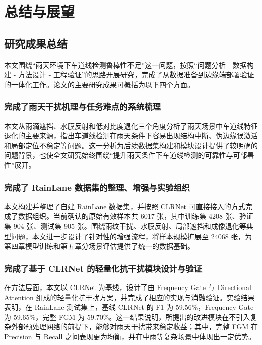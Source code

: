 \chapter{总结与展望}
\label{chap:conclusion}

\section{研究成果总结}
\label{sec:achievement}

本文围绕“雨天环境下车道线检测鲁棒性不足”这一问题，按照“问题分析 - 数据构建 - 方法设计 - 工程验证”的思路开展研究，完成了从数据准备到边缘端部署验证的一体化工作。论文的主要研究成果可概括为以下四个方面。

\subsection{完成了雨天干扰机理与任务难点的系统梳理}

本文从雨滴遮挡、水膜反射和低对比度退化三个角度分析了雨天场景中车道线特征退化的主要来源，指出车道线检测在雨天条件下容易出现结构中断、伪边缘误激活和局部定位不稳定等问题。这一分析为后续数据集构建和模块设计提供了较明确的问题背景，也使全文研究始终围绕“提升雨天条件下车道线检测的可靠性与可部署性”展开。

\subsection{完成了 RainLane 数据集的整理、增强与实验组织}

本文构建并整理了自建 RainLane 数据集，并按照 CLRNet 可直接接入的方式完成了数据组织。当前确认的原始有效样本共 6017 张，其中训练集 4208 张、验证集 904 张、测试集 905 张。围绕雨纹干扰、水膜反射、局部遮挡和成像退化等典型问题，本文进一步设计了针对性的增强流程，将样本规模扩展至 24068 张，为第四章模型训练和第五章分场景评估提供了统一的数据基础。

\subsection{完成了基于 CLRNet 的轻量化抗干扰模块设计与验证}

在方法层面，本文以 CLRNet 为基线，设计了由 Frequency Gate 与 Directional Attention 组成的轻量化抗干扰方案，并完成了相应的实现与消融验证。实验结果表明，在 RainLane 测试集上，基线 CLRNet 的 F1 为 59.56\%，Frequency Gate 为 59.65\%，完整 FGM 为 59.70\%。这一结果说明，所提出的改进模块在不引入复杂外部预处理网络的前提下，能够对雨天干扰带来稳定收益；其中，完整 FGM 在 Precision 与 Recall 之间表现更为均衡，并在中雨等复杂场景中体现出一定优势。

